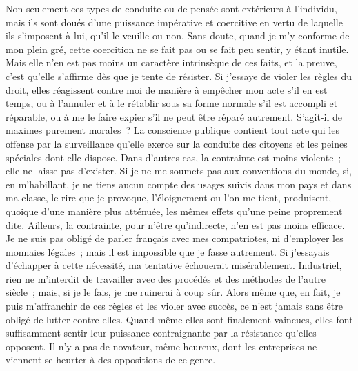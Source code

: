 \documentclass[french,twoside]{book} %
\begin{document}
Non seulement ces types de conduite ou de pensée sont extérieurs à l’individu, mais ils sont doués d’une puissance impérative et coercitive en vertu de laquelle ils s’imposent à lui, qu’il le veuille ou non. Sans doute, quand je m’y conforme de mon plein gré, cette coercition ne se fait pas ou se fait peu sentir, y étant inutile. Mais elle n’en est pas moins un caractère intrinsèque de ces faits, et la preuve, c’est qu’elle s’affirme dès que je tente de résister. Si j’essaye de violer les règles du droit, elles réagissent contre moi de manière à empêcher mon acte s’il en est temps, ou à l’annuler et à le rétablir sous sa forme normale s’il est accompli et réparable, ou à me le faire expier s’il ne peut être réparé autrement. S’agit-il de maximes purement morales ? La conscience publique contient tout acte qui les offense par la surveillance qu’elle exerce sur la conduite des citoyens et les peines spéciales dont elle dispose. Dans d’autres cas, la contrainte est moins violente ; elle ne laisse pas d’exister. Si je ne me soumets pas aux conventions du monde, si, en m’habillant, je ne tiens aucun compte des usages suivis dans mon pays et dans ma classe, le rire que je provoque, l’éloignement ou l’on me tient, produisent, quoique d’une manière plus atténuée, les mêmes effets qu’une peine proprement dite. Ailleurs, la contrainte, pour n’être qu’indirecte, n’en est pas moins efficace. Je ne suis pas obligé de parler français avec mes compatriotes, ni d’employer les monnaies légales ; mais il est impossible que je fasse autrement. Si j’essayais d’échapper à cette nécessité, ma tentative échouerait misérablement. Industriel, rien ne m’interdit de travailler avec des procédés et des méthodes de l’autre siècle ; mais, si je le fais, je me ruinerai à coup sûr. Alors même que, en fait, je puis m’affranchir de ces règles et les violer avec succès, ce n’est jamais sans être obligé de lutter contre elles. Quand même elles sont finalement vaincues, elles font suffisamment sentir leur puissance contraignante par la résistance qu’elles opposent. Il n’y a pas de novateur, même heureux, dont les entreprises ne viennent se heurter à des oppositions de ce genre.\par
\end{document}
